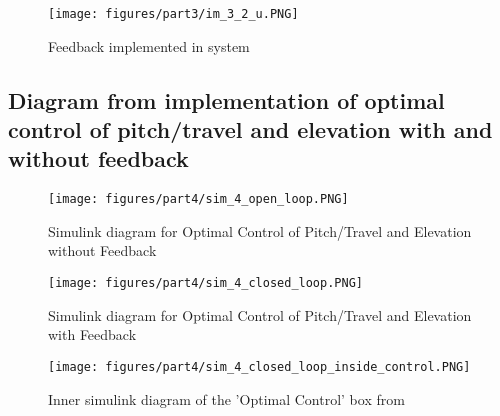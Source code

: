 \begin{figure}[!h]
	\centering
	\texttt{[image: figures/part3/im\_3\_2\_u.PNG]}
	\caption{Feedback implemented in system}
    \label{fig:3_2_u}
\end{figure} 


\newpage

\subsection{Diagram from implementation of optimal control of pitch/travel and elevation with
and without feedback}

\begin{figure}[!h]
    \centering
	\texttt{[image: figures/part4/sim\_4\_open\_loop.PNG]}
	\caption{Simulink diagram for Optimal Control of Pitch/Travel and Elevation without Feedback}
\label{fig:L4_sim_open}
\end{figure}

\begin{figure}[!h]
    \centering
	\texttt{[image: figures/part4/sim\_4\_closed\_loop.PNG]}
	\caption{Simulink diagram for Optimal Control of Pitch/Travel and Elevation with Feedback}
\label{fig:L4_sim_closed}
\end{figure}

\begin{figure}[!h]
    \centering
	\texttt{[image: figures/part4/sim\_4\_closed\_loop\_inside\_control.PNG]}
	\caption{Inner simulink diagram of the 'Optimal Control' box from }
\label{fig:L4_sim_closed_control}
\end{figure}

\newpage